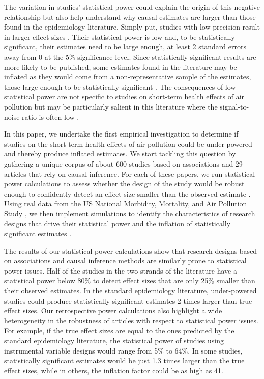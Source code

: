 \documentclass[12pt]{article}
\begin{document}
     The variation in studies' statistical power could explain the origin of this negative relationship but also help understand why causal estimates are larger than those found in the epidemiology literature. Simply put, studies with low precision result in larger effect sizes \citep{ioannidis2008most, gelman_beyond_2014}. Their statistical power is low and, to be statistically significant, their estimates need to be large enough, at least 2 standard errors away from 0 at the 5\% significance level. Since statistically significant results are more likely to be published, some estimates found in the literature may be inflated as they would come from a non-representative sample of the estimates, those large enough to be statistically significant \citep{brodeur2016star, brodeur_methods_2020}. The consequences of low statistical power are not specific to studies on short-term health effects of air pollution but may be particularly salient in this literature where the signal-to-noise ratio is often low \citep{peng2006model, peng2008statistical}.
    
    In this paper, we undertake the first empirical investigation to determine if studies on the short-term health effects of air pollution could be under-powered and thereby produce inflated estimates. We start tackling this question by gathering a unique corpus of about 600 studies based on associations and 29 articles that rely on causal inference. For each of these papers, we run statistical power calculations to assess whether the design of the study would be robust enough to confidently detect an effect size smaller than the observed estimate \citep{gelman_beyond_2014, ioannidis_power_2017, lu_note_2019, timm_retrodesign_2019}. Using real data from the US National Morbidity, Mortality, and Air Pollution Study \citep{samet2000national}, we then implement simulations to identify the characteristics of research designs that drive their statistical power and the inflation of statistically significant estimates \citep{black2019simulated, gelman2020regression, altoe_enhancing_2020}. 
            
    The results of our statistical power calculations show that research designs based on associations and causal inference methods are similarly prone to statistical power issues. Half of the studies in the two strands of the literature have a statistical power below 80\% to detect effect sizes that are only 25\% smaller than their observed estimates. In the standard epidemiology literature, under-powered studies could produce statistically significant estimates 2 times larger than true effect sizes. Our retrospective power calculations also highlight a wide heterogeneity in the robustness of articles with respect to statistical power issues. For example, if the true effect sizes are equal to the ones predicted by the standard epidemiology literature, the statistical power of studies using instrumental variable designs would range from 5\% to 64\%. In some studies, statistically significant estimates would be just 1.3 times larger than the true effect sizes, while in others, the inflation factor could be as high as 41.
    
\end{document}
